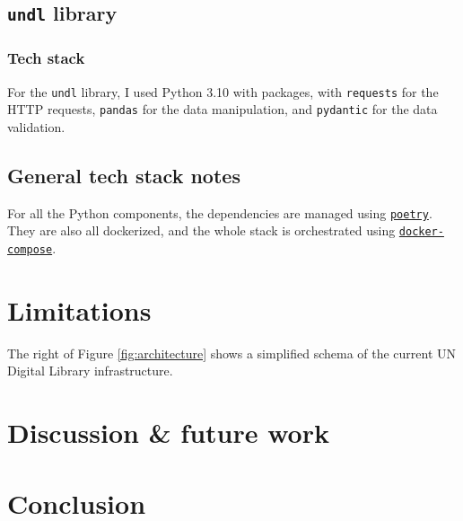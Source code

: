 \documentclass[11pt]{article}
\begin{document}
\subsection{\texttt{undl} library}

\subsubsection*{Tech stack}

For the \texttt{undl} library, I used Python 3.10 with packages, with \texttt{requests} for the HTTP requests, \texttt{pandas} for the data manipulation, and \texttt{pydantic} for the data validation.


\subsection{General tech stack notes}

For all the Python components, the dependencies are managed using \href{https://github.com/python-poetry/poetry}{\texttt{poetry}}. They are also all dockerized, and the whole stack is orchestrated using \href{https://docs.docker.com/compose/}{\texttt{docker-compose}}.

\section{Limitations} \label{limit}


The right of Figure \ref{fig:architecture} shows a simplified schema of the current UN Digital Library infrastructure.


\section{Discussion \& future work}

\section*{Conclusion}
\end{document}
